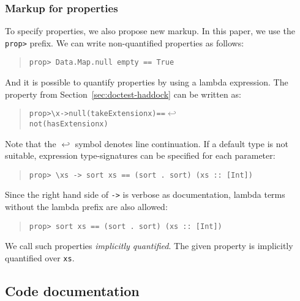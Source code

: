 \documentclass[preprint]{sigplanconf}
\begin{document}
\subsubsection{Markup for properties}
\label{sec:markup}

\noindent To specify properties, we also propose new markup. In this paper, we
use the {\tt prop>} prefix. We can write non-quantified properties as follows:

\begin{quote}
\small
\begin{verbatim}
prop> Data.Map.null empty == True
\end{verbatim}
\end{quote}

\noindent And it is possible to quantify properties by using a
lambda expression. The property from Section~\ref{sec:doctest-haddock}
can be written as:

\begin{quote}
\small
\begin{alltt}
prop> \verb|\|x -> null (takeExtension x) == \(\hookleftarrow\)
            not (hasExtension x)
\end{alltt}
\end{quote}

\noindent Note that the $\hookleftarrow$ symbol denotes line
continuation.
If a default type is not suitable, expression type-signatures can be
specified for each parameter:

\begin{quote}
\small
\begin{verbatim}
prop> \xs -> sort xs == (sort . sort) (xs :: [Int])
\end{verbatim}
\end{quote}

\noindent Since the right hand side of {\tt ->} is verbose as documentation,
lambda terms without the lambda prefix are also allowed:

\begin{quote}
\small
\begin{verbatim}
prop> sort xs == (sort . sort) (xs :: [Int])
\end{verbatim}
\end{quote}

\noindent We call such properties \emph{implicitly quantified}.  The
given property is implicitly quantified over \verb|xs|.

\subsection{Code documentation}
\label{sec:code-doc}
\end{document}
